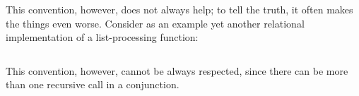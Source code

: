 This convention, however, does not always help; to tell the truth, it often makes the things even worse. Consider 
as an example yet another relational implementation of a list-processing function:

\begin{lstlisting}
\end{lstlisting}

This convention, however, cannot be always respected, since there can be more than one recursive 
call in a conjunction. 




